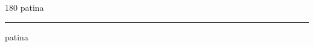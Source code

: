 
\begin{frame}
\begin{center}
\begin{turn}{180}
{\fontsize{2.5cm}{1em}\selectfont patina}
\end{turn}
\vspace{1em}\par  
\hrule
\vspace{1em}\par  
{\fontsize{2.5cm}{1em}\selectfont patina}
\end{center}
\end{frame}
